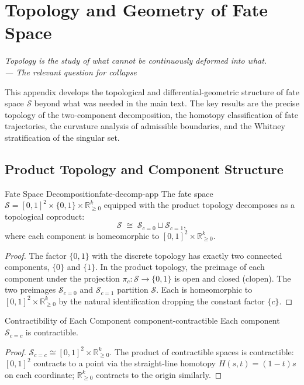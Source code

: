\documentclass[12pt,twoside,openright]{book}
\newcommand{\fateSpace}{\mathcal{S}}
\newcommand{\collapseInd}{c}             %
\newcommand{\fateComp}[1]{\fateSpace_{\collapseInd=#1}}
\newenvironment{epigraph}[2]{%
  \vspace{1em}\begin{flushright}
  \begin{minipage}{0.72\textwidth}
  \itshape\small #1\\[0.4em]
  \upshape\footnotesize\sffamily\color{DistGray}--- #2
  \end{minipage}\end{flushright}\vspace{1.5em}}{}
\providecommand{\fateComp}[1]{\fateSpace_{\collapseInd=#1}}
\begin{document}

\chapter{Topology and Geometry of Fate Space}
\label{app:topology}

\begin{epigraph}{Topology is the study of what cannot be
  continuously deformed into what.}{The relevant question
  for collapse}
\end{epigraph}

This appendix develops the topological and differential-geometric
structure of fate space $\fateSpace$ beyond what was needed in
the main text. The key results are the precise topology of the
two-component decomposition, the homotopy classification of
fate trajectories, the curvature analysis of admissible
boundaries, and the Whitney stratification of the singular set.

\section{Product Topology and Component Structure}

\begin{theorem}{Fate Space Decomposition}{fate-decomp-app}
The fate space $\fateSpace=[0,1]^2\times\{0,1\}\times
\mathbb{R}_{\ge0}^k$ equipped with the product topology
decomposes as a topological coproduct:
\[
  \fateSpace \;\cong\; \fateComp{0}\sqcup\fateComp{1},
\]
where each component is homeomorphic to
$[0,1]^2\times\mathbb{R}_{\ge0}^k$.
\begin{proof}
The factor $\{0,1\}$ with the discrete topology has exactly
two connected components, $\{0\}$ and $\{1\}$. In the product
topology, the preimage of each component under the projection
$\pi_c:\fateSpace\to\{0,1\}$ is open and closed (clopen).
The two preimages $\fateComp{0}$ and $\fateComp{1}$ partition
$\fateSpace$. Each is homeomorphic to $[0,1]^2\times
\mathbb{R}_{\ge0}^k$ by the natural identification dropping
the constant factor $\{c\}$.
\end{proof}
\end{theorem}

\begin{theorem}{Contractibility of Each Component}%
  {component-contractible}
Each component $\fateComp{c}$ is contractible.
\begin{proof}
$\fateComp{c}\cong[0,1]^2\times\mathbb{R}_{\ge0}^k$.
The product of contractible spaces is contractible:
$[0,1]^2$ contracts to a point via the straight-line
homotopy $H(s,t)=(1-t)s$ on each coordinate; $\mathbb{R}
_{\ge0}^k$ contracts to the origin similarly.
\end{proof}
\end{theorem}
\end{document}
